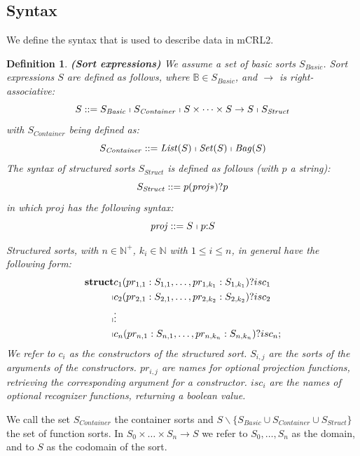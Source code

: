 \documentclass[a4paper,11pt]{article}
\newcommand{\Bools}{{\mathbb B}}   %
\newcommand{\Nats}{{\mathbb N}}    %
\newcommand{\Natspos}{{\mathbb N^+}} %
\newcommand{\List}{{\mathit{List}}}
\newcommand{\Set}{{\mathit{Set}}}
\newcommand{\Bag}{{\mathit{Bag}}}
\newcommand{\basicsort}{{S_{\mathit{Basic}}}}
\newcommand{\containersort}{{S_{\mathit{Container}}}}
\newcommand{\structsort}{{S_{\mathit{Struct}}}}
\newtheorem{thdefinition}{Definition}[section]
\newenvironment{definition}
  {\begin{thdefinition}\em}
  {\end{thdefinition}}
\begin{document}
\subsection{Syntax}
We define the syntax that is used to describe data in mCRL2.

\begin{definition}\textbf{(Sort expressions)}
We assume a set of basic sorts $\basicsort$.
Sort expressions $S$ are defined as follows, where $\Bools \in \basicsort$, and $\rightarrow$ is right-associative:
\begin{equation*}
 S ::= \basicsort \shortmid \containersort \shortmid S \times \dots \times S \rightarrow S \shortmid \structsort
\end{equation*}
with $\containersort$ being defined as:
\begin{equation*}
 \containersort ::= \List(S) \shortmid \Set(S) \shortmid \Bag(S)
\end{equation*}
The syntax of structured sorts $\structsort$ is defined as follows (with $p$ a string):
\begin{equation*}
 \structsort ::= p({\it proj}*)?p
\end{equation*}
in which $proj$ has the following syntax:
\begin{equation*}
 {\it proj} ::= S \shortmid p{:}S
\end{equation*}

Structured sorts, with $n \in \Natspos$, $k_i \in \Nats$ with $1 \leq i \leq n$, in general have the following form:
\begin{eqnarray*}
\textbf{struct} & c_1(pr_{1,1}:S_{1,1}, \dots, pr_{1,k_1}:S_{1,k_1})?isc_1\\
              \shortmid & c_2(pr_{2,1}:S_{2,1}, \dots, pr_{2,k_2}:S_{2,k_2})?isc_2\\
              \shortmid & \vdots\\
              \shortmid & c_n(pr_{n,1}:S_{n,1}, \dots, pr_{n,k_n}:S_{n,k_n})?isc_n;
\end{eqnarray*}
We refer to $c_i$ as the constructors of the structured sort. $S_{i,j}$ are the sorts of the arguments of the constructors. $pr_{i,j}$ are names for optional projection functions, retrieving the corresponding argument for a constructor. $isc_i$ are the names of optional recognizer functions, returning a boolean value.
\end{definition}
We call the set  $\containersort$ the container sorts and $S \backslash \{ \basicsort \cup \containersort \cup \structsort \}$ the set of function sorts. In $S_0 \times \dots \times S_n \rightarrow S$ we refer to $S_0, \dots, S_n$ as the domain, and to $S$ as the codomain of the sort.
\end{document}

